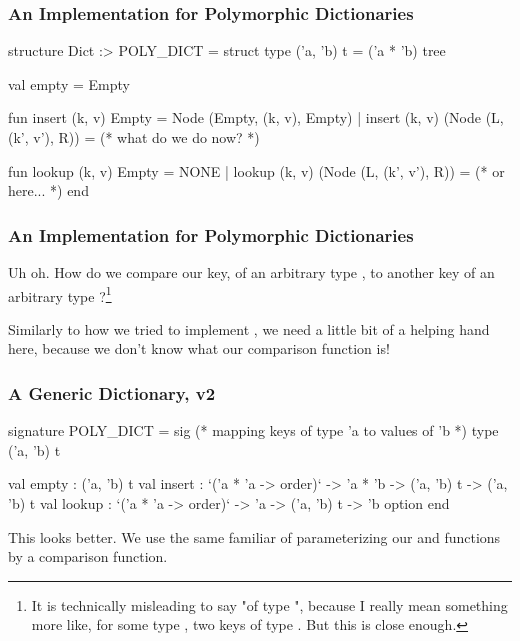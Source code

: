 \documentclass[aspectratio=169, handout]{beamer}
\begin{document}
\begin{frame}[fragile]
  \frametitle{An Implementation for Polymorphic Dictionaries}

  { \small
  \begin{codeblock}
    structure Dict :> POLY_DICT =
      struct
        type ('a, 'b) t = ('a * 'b) tree

        val empty = Empty

        fun insert (k, v) Empty = Node (Empty, (k, v), Empty)
          | insert (k, v) (Node (L, (k', v'), R)) =
              (* what do we do now? *)

        fun lookup (k, v) Empty = NONE
          | lookup (k, v) (Node (L, (k', v'), R)) =
              (* or here... *)
    end
  \end{codeblock}
  }

\end{frame}

\begin{frame}[fragile]
  \frametitle{An Implementation for Polymorphic Dictionaries}

  Uh oh. How do we compare our key, of an arbitrary type , to
  another key of an arbitrary type ?\footnote{
    It is technically misleading to say "of type ",
    because I really mean something more like, for some type , two
    keys of type . But this is close enough.
  }

  \pause
  \vspace{\fill}

  Similarly to how we tried to implement ,
  we need a little bit of a helping hand here, because we don't know what
  our comparison function is!
\end{frame}

\begin{frame}[fragile]
  \frametitle{A Generic Dictionary, v2}

  {\small
  \begin{codeblock}
    signature POLY_DICT =
      sig
        (* mapping keys of type 'a to values of 'b *)
        type ('a, 'b) t

        val empty : ('a, 'b) t
        val insert :
          `('a * 'a -> order)` -> 'a * 'b -> ('a, 'b) t -> ('a, 'b) t
        val lookup :
          `('a * 'a -> order)` -> 'a -> ('a, 'b) t -> 'b option
      end
  \end{codeblock}
  }

  \pause
  \vspace{\fill}

  This looks better. We use the same familiar of parameterizing our
   and  functions by a comparison function.
\end{frame}
\end{document}
